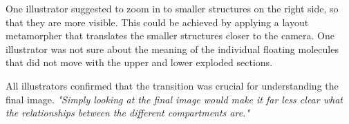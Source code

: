 One illustrator suggested to zoom in to smaller structures on the right side, so that they are more visible. This could be achieved by applying a layout metamorpher that translates the smaller structures closer to the camera. One illustrator was not sure about the meaning of the individual floating molecules that did not move with the upper and lower exploded sections.%

All illustrators confirmed that the transition was crucial for understanding the final image. \textit{"Simply looking at the final image would make it far less clear what the relationships between the different compartments are."}










